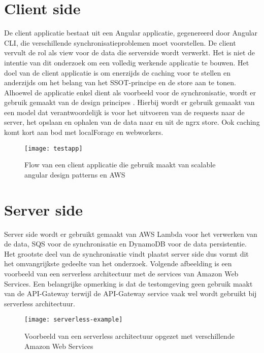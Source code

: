 \section{Client side}
De client applicatie bestaat uit een Angular applicatie, gegenereerd door Angular CLI, die verschillende synchronisatieproblemen moet voorstellen. De client vervult de rol als view voor de data die serverside wordt verwerkt. Het is niet de intentie van dit onderzoek om een volledig werkende applicatie te bouwen. Het doel van de client applicatie is om enerzijds de caching voor te stellen en anderzijds om het belang van het SSOT-principe en de store aan te tonen. Alhoewel de applicatie enkel dient als voorbeeld voor de synchronisatie, wordt er gebruik gemaakt van de design principes \autocite{brechtbilliet-scalable}\autocite{minko-gechev-scalable}. Hierbij wordt er gebruik gemaakt van een model dat verantwoordelijk is voor het uitvoeren van de requests naar de server, het opslaan en ophalen van de data naar en uit de ngrx store. Ook caching komt kort aan bod met localForage en webworkers.
\begin{figure}[h]
\caption{Flow van een client applicatie die gebruik maakt van scalable angular design patterns en AWS}
\centering
\texttt{[image: testapp]}
\end{figure}
\section{Server side}
Server side wordt er gebruikt gemaakt van AWS Lambda voor het verwerken van de data, SQS voor de synchronisatie en DynamoDB voor de data persistentie. Het grootste deel van de synchronisatie vindt plaatst server side dus vormt dit het omvangrijkste gedeelte van het onderzoek. Volgende afbeelding is een voorbeeld van een serverless \autocite{scalable-theorie} architectuur met de services van Amazon Web Services. Een belangrijke opmerking is dat de testomgeving geen gebruik maakt van de API-Gateway terwijl de API-Gateway service vaak\autocite{scalable-theorie}  wel wordt gebruikt bij serverless architectuur. 
\begin{figure}[h]
\caption{Voorbeeld van een serverless architectuur opgezet met verschillende Amazon Web Services}
\centering
\texttt{[image: serverless-example]}
\end{figure}
